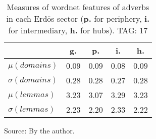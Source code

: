 \begin{table}[h!]
\begin{center}
\caption{Measures of wordnet features of adverbs in each Erd\"os sector ({{\bf p.}} for periphery, {{\bf i.}} for intermediary, {{\bf h.}} for hubs). TAG: 17}
	\label{tab:wnr}
\begin{tabular}{| l || c | c | c | c |}\hline
 & {\bf g.} & {\bf p.} & {\bf i.} & {\bf h.} \\\hline\hline
$\mu(domains)$ & 0.09  & 0.09  & 0.08  & 0.09 \\
$\sigma(domains)$ & 0.28  & 0.28  & 0.27  & 0.28 \\\hline
$\mu(lemmas)$ & 3.23  & 3.07  & 3.29  & 3.23 \\
$\sigma(lemmas)$ & 2.23  & 2.20  & 2.33  & 2.22 \\\hline
\end{tabular}
\begin{flushleft}\footnotesize
		Source: By the author.\
\end{flushleft}
\end{center}
\end{table}
